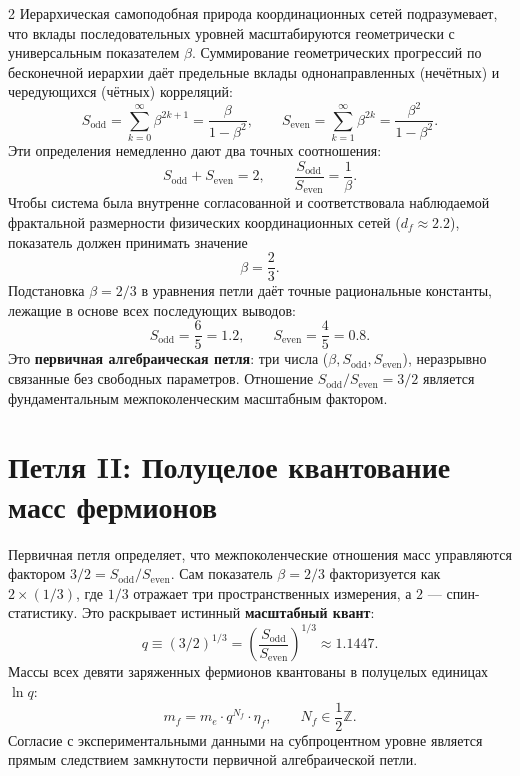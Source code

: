 \documentclass[12pt,a4paper]{article}
\begin{document}
\begin{multicols}{2}
		Иерархическая самоподобная природа координационных сетей подразумевает, что вклады последовательных уровней масштабируются геометрически с универсальным показателем \(\beta\). Суммирование геометрических прогрессий по бесконечной иерархии даёт предельные вклады однонаправленных (нечётных) и чередующихся (чётных) корреляций:
		\begin{equation}
			S_{\mathrm{odd}} = \sum_{k=0}^{\infty} \beta^{2k+1} = \frac{\beta}{1-\beta^{2}}, \qquad
			S_{\mathrm{even}} = \sum_{k=1}^{\infty} \beta^{2k} = \frac{\beta^{2}}{1-\beta^{2}}.
		\end{equation}
		Эти определения немедленно дают два точных соотношения:
		\begin{equation}
			S_{\mathrm{odd}} + S_{\mathrm{even}} = 2, \qquad \frac{S_{\mathrm{odd}}}{S_{\mathrm{even}}} = \frac{1}{\beta}.
		\end{equation}
		Чтобы система была внутренне согласованной и соответствовала наблюдаемой фрактальной размерности физических координационных сетей (\(d_f \approx 2.2\)), показатель должен принимать значение
		\begin{equation}
			\boxed{\beta = \frac{2}{3}}.
		\end{equation}
		Подстановка \(\beta = 2/3\) в уравнения петли даёт точные рациональные константы, лежащие в основе всех последующих выводов:
		\begin{equation}
			\boxed{S_{\mathrm{odd}} = \frac{6}{5} = 1.2, \qquad S_{\mathrm{even}} = \frac{4}{5} = 0.8.}
		\end{equation}
		Это \textbf{первичная алгебраическая петля}: три числа (\(\beta, S_{\mathrm{odd}}, S_{\mathrm{even}}\)), неразрывно связанные без свободных параметров. Отношение \(S_{\mathrm{odd}}/S_{\mathrm{even}} = 3/2\) является фундаментальным межпоколенческим масштабным фактором.
		
		\section{Петля II: Полуцелое квантование масс фермионов}
		
		Первичная петля определяет, что межпоколенческие отношения масс управляются фактором \(3/2 = S_{\mathrm{odd}}/S_{\mathrm{even}}\). Сам показатель \(\beta = 2/3\) факторизуется как \(2 \times (1/3)\), где \(1/3\) отражает три пространственных измерения, а \(2\) — спин-статистику. Это раскрывает истинный \textbf{масштабный квант}:
		\begin{equation}
			q \equiv (3/2)^{1/3} = \left( \frac{S_{\mathrm{odd}}}{S_{\mathrm{even}}} \right)^{1/3} \approx 1.1447.
		\end{equation}
		Массы всех девяти заряженных фермионов квантованы в полуцелых единицах \(\ln q\):
		\begin{equation}
			m_f = m_e \cdot q^{N_f} \cdot \eta_f, \qquad N_f \in \frac{1}{2}\mathbb{Z}.
		\end{equation}
		Согласие с экспериментальными данными на субпроцентном уровне является прямым следствием замкнутости первичной алгебраической петли.
		

\end{multicols}
\end{document}
